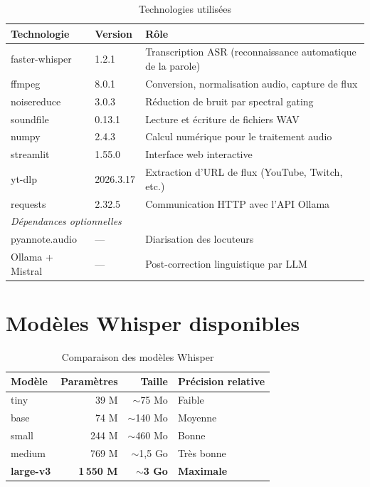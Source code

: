 \documentclass[12pt,a4paper]{report}
\begin{document}
\begin{table}[H]
    \centering
    \caption{Technologies utilisées}
    \label{tab:techstack}
    \begin{tabular}{@{} l l p{7cm} @{}}
        \toprule
        \textbf{Technologie} & \textbf{Version} & \textbf{Rôle} \\
        \midrule
        faster-whisper & 1.2.1 & Transcription ASR (reconnaissance automatique de la parole) \\
        ffmpeg & 8.0.1 & Conversion, normalisation audio, capture de flux \\
        noisereduce & 3.0.3 & Réduction de bruit par spectral gating \\
        soundfile & 0.13.1 & Lecture et écriture de fichiers WAV \\
        numpy & 2.4.3 & Calcul numérique pour le traitement audio \\
        streamlit & 1.55.0 & Interface web interactive \\
        yt-dlp & 2026.3.17 & Extraction d'URL de flux (YouTube, Twitch, etc.) \\
        requests & 2.32.5 & Communication HTTP avec l'API Ollama \\
        \midrule
        \multicolumn{3}{l}{\textit{Dépendances optionnelles}} \\
        \midrule
        pyannote.audio & — & Diarisation des locuteurs \\
        Ollama + Mistral & — & Post-correction linguistique par LLM \\
        \bottomrule
    \end{tabular}
\end{table}

\section{Modèles Whisper disponibles}

\begin{table}[H]
    \centering
    \caption{Comparaison des modèles Whisper}
    \label{tab:models}
    \begin{tabular}{@{} l r r l @{}}
        \toprule
        \textbf{Modèle} & \textbf{Paramètres} & \textbf{Taille} & \textbf{Précision relative} \\
        \midrule
        tiny & 39 M & $\sim$75 Mo & Faible \\
        base & 74 M & $\sim$140 Mo & Moyenne \\
        small & 244 M & $\sim$460 Mo & Bonne \\
        medium & 769 M & $\sim$1,5 Go & Très bonne \\
        \textbf{large-v3} & \textbf{1\,550 M} & $\sim$\textbf{3 Go} & \textbf{Maximale} \\
        \bottomrule
    \end{tabular}
\end{table}
\end{document}
